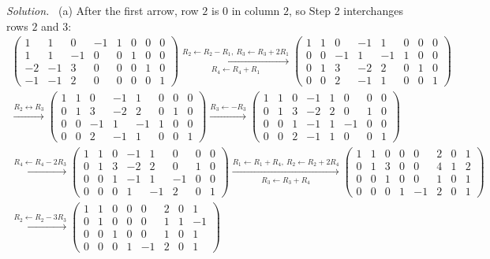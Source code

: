 \documentclass[12pt]{article}
\theoremstyle{definition}
\newenvironment{solution}{\par\noindent\textit{Solution.}\ }{\par\smallskip}
\begin{document}
\begin{solution}
(a) After the first arrow, row \(2\) is \(0\) in column \(2\), so Step 2 interchanges rows \(2\) and \(3\):
\[
\begin{gathered}
\left(\begin{array}{cccc|cccc}1&1&0&-1&1&0&0&0\\1&1&-1&0&0&1&0&0\\-2&-1&3&0&0&0&1&0\\-1&-1&2&0&0&0&0&1\end{array}\right)
\xrightarrow[R_4\leftarrow R_4+R_1]{R_2\leftarrow R_2-R_1,\ R_3\leftarrow R_3+2R_1}
\left(\begin{array}{cccc|cccc}1&1&0&-1&1&0&0&0\\0&0&-1&1&-1&1&0&0\\0&1&3&-2&2&0&1&0\\0&0&2&-1&1&0&0&1\end{array}\right)
\\
\xrightarrow{R_2\leftrightarrow R_3}
\left(\begin{array}{cccc|cccc}1&1&0&-1&1&0&0&0\\0&1&3&-2&2&0&1&0\\0&0&-1&1&-1&1&0&0\\0&0&2&-1&1&0&0&1\end{array}\right)
\xrightarrow{R_3\leftarrow-R_3}
\left(\begin{array}{cccc|cccc}1&1&0&-1&1&0&0&0\\0&1&3&-2&2&0&1&0\\0&0&1&-1&1&-1&0&0\\0&0&2&-1&1&0&0&1\end{array}\right)
\\
\xrightarrow{R_4\leftarrow R_4-2R_3}
\left(\begin{array}{cccc|cccc}1&1&0&-1&1&0&0&0\\0&1&3&-2&2&0&1&0\\0&0&1&-1&1&-1&0&0\\0&0&0&1&-1&2&0&1\end{array}\right)
\xrightarrow[R_3\leftarrow R_3+R_4]{R_1\leftarrow R_1+R_4,\ R_2\leftarrow R_2+2R_4}
\left(\begin{array}{cccc|cccc}1&1&0&0&0&2&0&1\\0&1&3&0&0&4&1&2\\0&0&1&0&0&1&0&1\\0&0&0&1&-1&2&0&1\end{array}\right)
\\
\xrightarrow{R_2\leftarrow R_2-3R_3}
\left(\begin{array}{cccc|cccc}1&1&0&0&0&2&0&1\\0&1&0&0&0&1&1&-1\\0&0&1&0&0&1&0&1\\0&0&0&1&-1&2&0&1\end{array}\right)

\end{gathered}\]
\end{solution}
\end{document}
